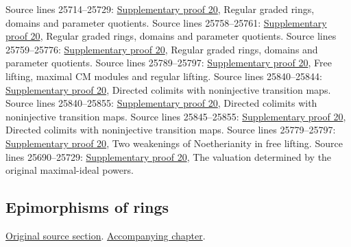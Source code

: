 \begin{AlgebraSourceRoutes}
 Source lines 25714--25729: \hyperlink{algebra_catenary_regular_notes_20260928}{Supplementary proof 20}, Regular graded rings, domains and parameter quotients.
 Source lines 25758--25761: \hyperlink{algebra_catenary_regular_notes_20260928}{Supplementary proof 20}, Regular graded rings, domains and parameter quotients.
 Source lines 25759--25776: \hyperlink{algebra_catenary_regular_notes_20260928}{Supplementary proof 20}, Regular graded rings, domains and parameter quotients.
 Source lines 25789--25797: \hyperlink{algebra_catenary_regular_notes_20260928}{Supplementary proof 20}, Free lifting, maximal CM modules and regular lifting.
 Source lines 25840--25844: \hyperlink{algebra_catenary_regular_notes_20260928}{Supplementary proof 20}, Directed colimits with noninjective transition maps.
 Source lines 25840--25855: \hyperlink{algebra_catenary_regular_notes_20260928}{Supplementary proof 20}, Directed colimits with noninjective transition maps.
 Source lines 25845--25855: \hyperlink{algebra_catenary_regular_notes_20260928}{Supplementary proof 20}, Directed colimits with noninjective transition maps.
 Source lines 25779--25797: \hyperlink{algebra_catenary_regular_notes_20260928}{Supplementary proof 20}, Two weakenings of Noetherianity in free lifting.
 Source lines 25690--25729: \hyperlink{algebra_catenary_regular_notes_20260928}{Supplementary proof 20}, The valuation determined by the original maximal-ideal powers.
\end{AlgebraSourceRoutes}

\subsection{Epimorphisms of rings}
\hypertarget{algebra-source-section-epimorphism}{}
\noindent\href{https://github.com/stacks/stacks-project/blob/a04446e57ec1fbc252a871afcec7752fb2807b14/algebra.tex\#L25862}{Original source section}. \href{algebra.pdf\#nameddest=section-epimorphism}{Accompanying chapter}.

